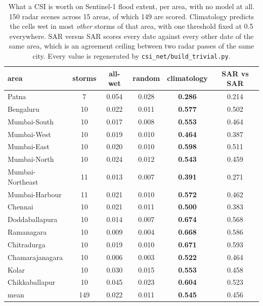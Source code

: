 \begin{table}[!t]
\centering
\caption{What a CSI is worth on Sentinel-1 flood extent, per area, with no model at all. 150 radar
scenes across 15 areas, of which 149 are scored. Climatology predicts the cells wet in most
\emph{other} storms of that area, with one threshold fixed at 0.5 everywhere. SAR versus SAR scores
every date against every other date of the same area, which is an agreement ceiling between two
radar passes of the same city. Every value is regenerated by \texttt{csi\_net/build\_trivial.py}.}
\label{tab:trivial}
\begin{tabular}{lccccc}
\toprule
area & storms & all-wet & random & climatology & SAR vs SAR \\
\midrule
Patna             &  7 & 0.054 & 0.028 & \textbf{0.286} & 0.214 \\
\midrule
Bengaluru         & 10 & 0.022 & 0.011 & \textbf{0.577} & 0.502 \\
\midrule
Mumbai-South      & 10 & 0.017 & 0.008 & \textbf{0.553} & 0.464 \\
Mumbai-West       & 10 & 0.019 & 0.010 & \textbf{0.464} & 0.387 \\
Mumbai-East       & 10 & 0.020 & 0.010 & \textbf{0.598} & 0.511 \\
Mumbai-North      & 10 & 0.024 & 0.012 & \textbf{0.543} & 0.459 \\
Mumbai-Northeast  & 11 & 0.013 & 0.007 & \textbf{0.391} & 0.271 \\
Mumbai-Harbour    & 11 & 0.021 & 0.010 & \textbf{0.572} & 0.462 \\
\midrule
Chennai           & 10 & 0.021 & 0.011 & \textbf{0.500} & 0.383 \\
\midrule
Doddaballapura    & 10 & 0.014 & 0.007 & \textbf{0.674} & 0.568 \\
Ramanagara        & 10 & 0.009 & 0.004 & \textbf{0.668} & 0.586 \\
Chitradurga       & 10 & 0.019 & 0.010 & \textbf{0.671} & 0.593 \\
Chamarajanagara   & 10 & 0.006 & 0.003 & \textbf{0.522} & 0.464 \\
Kolar             & 10 & 0.030 & 0.015 & \textbf{0.553} & 0.458 \\
Chikkaballapur    & 10 & 0.045 & 0.023 & \textbf{0.604} & 0.523 \\
\midrule
mean              & 149 & 0.022 & 0.011 & \textbf{0.545} & 0.456 \\
\bottomrule
\end{tabular}
\end{table}

